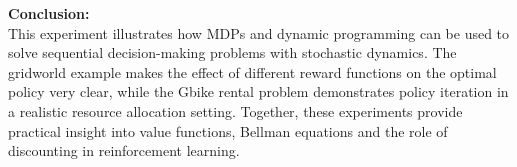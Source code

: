 \documentclass[14pt]{extreport}
\begin{document}
\vspace{1em}

\noindent\textbf{Conclusion:}\\
This experiment illustrates how MDPs and dynamic programming can be used to
solve sequential decision-making problems with stochastic dynamics. The
gridworld example makes the effect of different reward functions on the
optimal policy very clear, while the Gbike rental problem demonstrates policy
iteration in a realistic resource allocation setting. Together, these
experiments provide practical insight into value functions, Bellman equations
and the role of discounting in reinforcement learning.
\end{document}
